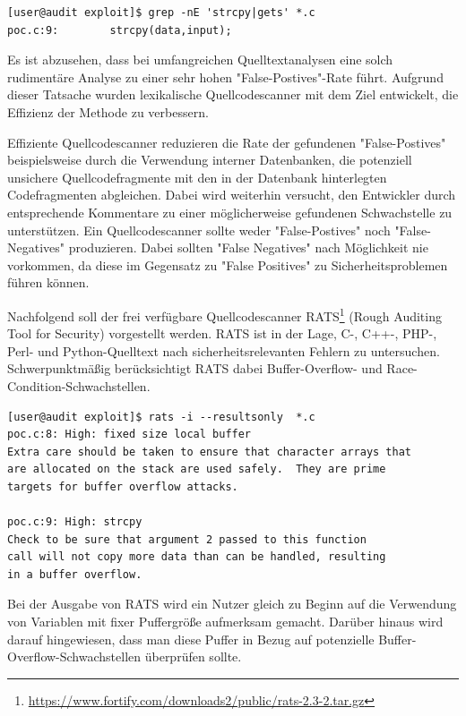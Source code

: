 \begin{lstlisting}[basicstyle=\ttfamily\footnotesize]
[user@audit exploit]$ grep -nE 'strcpy|gets' *.c
poc.c:9:        strcpy(data,input);
\end{lstlisting}

Es ist abzusehen, dass bei umfangreichen Quelltextanalysen eine solch 
rudimentäre Analyse zu einer sehr hohen "False-Postives"-Rate führt. 
Aufgrund dieser Tatsache wurden lexikalische Quellcodescanner mit dem 
Ziel entwickelt, die Effizienz der Methode zu verbessern.

Effiziente Quellcodescanner reduzieren die Rate der gefundenen 
"False-Postives" beispielsweise durch die Verwendung interner 
Datenbanken, die  potenziell unsichere Quellcodefragmente mit den in 
der Datenbank hinterlegten Codefragmenten abgleichen. Dabei wird 
weiterhin versucht, den Entwickler durch entsprechende Kommentare zu 
einer möglicherweise gefundenen Schwachstelle zu unterstützen. Ein 
Quellcodescanner sollte weder "False-Postives" noch "False-Negatives" 
produzieren. Dabei sollten "False Negatives" nach Möglichkeit nie 
vorkommen, da diese im Gegensatz zu "False Positives" zu 
Sicherheitsproblemen führen können.

Nachfolgend soll der frei verfügbare Quellcodescanner RATS\footnote{\url{https://www.fortify.com/downloads2/public/rats-2.3-2.tar.gz}} 
(Rough Auditing Tool for Security) vorgestellt werden. RATS ist in der 
Lage, C-, C++-, PHP-, Perl- und Python-Quelltext nach 
sicherheitsrelevanten Fehlern zu untersuchen. Schwerpunktmäßig 
berücksichtigt RATS dabei Buffer-Overflow- und Race-Condition-Schwachstellen.

\begin{lstlisting}[basicstyle=\ttfamily\footnotesize]
[user@audit exploit]$ rats -i --resultsonly  *.c
poc.c:8: High: fixed size local buffer
Extra care should be taken to ensure that character arrays that 
are allocated on the stack are used safely.  They are prime 
targets for buffer overflow attacks.

poc.c:9: High: strcpy
Check to be sure that argument 2 passed to this function 
call will not copy more data than can be handled, resulting 
in a buffer overflow.
\end{lstlisting}

Bei der Ausgabe von RATS wird ein Nutzer gleich zu Beginn auf die 
Verwendung von Variablen mit fixer Puffergröße aufmerksam gemacht. 
Darüber hinaus wird darauf hingewiesen, dass man diese Puffer in 
Bezug auf potenzielle Buffer-Overflow-Schwachstellen überprüfen sollte.

